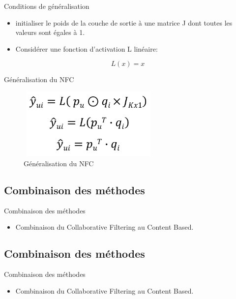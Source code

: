 \documentclass[xelatex,12pt]{beamer}
\begin{document}
\begin{frame}{Conditions de généralisation}
\begin{itemize}
  \item initialiser le poids de la couche de sortie à une matrice J dont toutes les valeurs sont égales à 1.
  \item Considérer une fonction d'activation L linéaire: 
  \end{itemize}
  $$L(x) = x$$
\end{frame}

\begin{frame}{Généralisation du NFC}
\begin{figure}[h]
\begin{center}
\includegraphics[width=7cm,height=3.5cm]{images/nfc_proof.png}
\caption[Généralisation du NFC]{Généralisation du NFC}
\label{monlabel}
\end{center}
\end{figure}
\end{frame}

\subsection{Combinaison des méthodes}
\begin{frame}{Combinaison des méthodes}
\begin{itemize}
  \item Combinaison du Collaborative Filtering au Content Based.
  \end{itemize}
\end{frame}

\subsection{Combinaison des méthodes}
\begin{frame}{Combinaison des méthodes}
\begin{itemize}
  \item Combinaison du Collaborative Filtering au Content Based.
  \end{itemize}
\end{frame}
\end{document}
